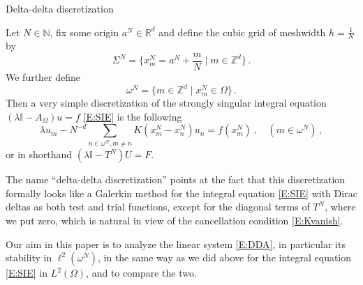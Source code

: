 \documentclass[12pt]{amsart}
\makeatletter
\def\subsection{\@startsection{section}{1}%
  \z@{1.2\linespacing\@plus\linespacing}{.5\linespacing}%
  {\normalfont\scshape\centering}}
\def\subsection{\@startsection{subsection}{2}%
  \z@{0.9\linespacing\@plus.7\linespacing}{-.5em}%
  {\normalfont\bfseries}}
\theoremstyle{definition}
\theoremstyle{remark}
\numberwithin{equation}{section}
\newcommand\R{{\mathbb R}}
\newcommand\N{{\mathbb N}}
\newcommand\Z{{\mathbb Z}}
\newcommand {\Id}{\mathbb I}
\makeatother
\begin{document}
\subsection{Delta-delta discretization}\label{SS:DDD}\ 

Let $N\in\N$, fix some origin $a^{N}\in\R^{d}$ and define the cubic grid of meshwidth $h=\frac1N$ by
$$
 \Sigma^{N}=\{x^{N}_{m}=a^{N}+\frac{m}N \mid m\in\Z^{d}\}\,.
$$ 
We further define 
$$
 \omega^{N} = \{m\in\Z^{d} \mid x^{N}_{m}\in \Omega\}\,.
$$
Then a very simple discretization of the strongly singular integral equation 
$(\lambda \Id -A_{\Omega})u=f$
\eqref{E:SIE} is the following
\begin{equation}
\label{E:DDA}
 \lambda u_{m} - N^{-d}\!\!\!\!\sum_{n\in\omega^{N},m\ne n}K(x^{N}_{m}-x^{N}_{n})u_{n}= f(x^{N}_{m}) \,,\quad (m\in\omega^{N})\,,
\end{equation}
or in shorthand $(\lambda\Id - T^{N})U=F$.

The name ``delta-delta discretization'' points at the fact that this discretization formally looks like a Galerkin method for the integral equation \eqref{E:SIE} with Dirac deltas as both test and trial functions, except for the diagonal terms of $T^{N}$, where we put zero, which is natural in view of the cancellation condition \eqref{E:Kvanish}.

Our aim in this paper is to analyze the linear system \eqref{E:DDA}, in particular its stability in $\ell^{2}(\omega^{N})$, in the same way as we did above for the integral equation \eqref{E:SIE} in $L^{2}(\Omega)$, and to compare the two.
\end{document}
